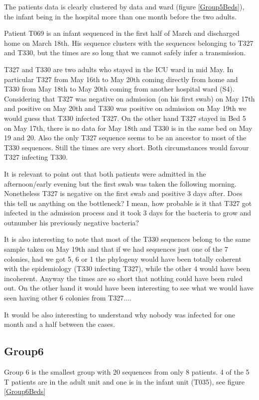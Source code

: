 \documentclass[12pt,a4paper]{article}
\begin{document}
The patients data is clearly clustered by data and ward (figure \ref{Group5Beds}), the infant being in the hospital more than one month before the two adults.

Patient T069 is an infant sequenced in the first half of March and discharged home on March 18th. His sequence clusters with the sequences belonging to T327 and T330, but the times are so long that we cannot safely infer a transmission.

T327 and T330 are two adults who stayed in the ICU ward in mid May. In particular T327 from May 16th to May 20th
coming directly from home and T330 from May 18th to May 20th coming from another hospital ward (S4). Considering that T327 was negative on admission  (on his first swab) on May 17th and positive on May 20th and T330 was positive on admission on May 19th we would guess that T330 infected T327. On the other hand T327 stayed in Bed 5 on May 17th, there is no data for May 18th and T330 is in the same bed on May 19 and 20. Also the only T327 sequence seems to be an ancestor to most of the T330 sequences. Still the times are very short. Both circumstances would favour T327 infecting T330.

It is relevant to point out that both patients were admitted in the afternoon/early evening but the first swab was taken the following morning. Nonetheless T327 is negative on the first swab and positive 3 days after. Does this tell us anything on the bottleneck? I mean, how probable is it that T327 got infected in the admission process and it took 3 days for the bacteria to grow and outnumber his previously negative bacteria?

It is also interesting to note that most of the T330 sequences belong to the same sample taken on May 19th and that if we had sequences just one of the 7 colonies, had we got 5, 6  or 1 the phylogeny would have been totally coherent with the epidemiology (T330 infecting T327), while the other 4 would have been incoherent. Anyway the times are so short that nothing could have been ruled out. On the other hand it would have been interesting to see what we would have seen having other 6 colonies from T327....  

It would be also interesting to understand why nobody was infected for one month and a half between the cases.

\subsection{Group6}
Group 6 is the smallest group with 20 sequences from only 8 patients. 4 of the 5 T patients are in the adult unit and one is in the infant unit (T035), see figure \ref{Group6Beds}
\end{document}

